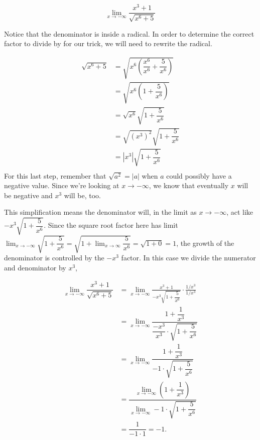 \documentclass{ximera}
\begin{document}
\begin{example}

\[
\lim_{x\to -\infty} \frac{x^3+1}{\sqrt{x^6+5}}
\]
\begin{explanation}
Notice that the denominator is inside a radical. In order to determine the correct factor to divide by for our trick, we will need to rewrite the radical.

\begin{align*}
	\sqrt{x^6 + 5} &= \sqrt{ x^6\left(\dfrac{x^6}{x^6} + \dfrac{5}{x^6}\right)}\\
				&=	\sqrt{ x^6\left( 1 + \dfrac{5}{x^6}\right) }\\
				&= \sqrt{x^6} \sqrt{1 + \dfrac{5}{x^6} }\\
				&= \sqrt{(x^3)^2} \sqrt{1 + \dfrac{5}{x^6} }\\
				&= |x^3|\sqrt{1 + \dfrac{5}{x^6} }\\
\end{align*}
For this last step, remember that $\sqrt{a^2} = |a|$ when $a$ could possibly have a negative value. Since we're looking at $x\to -\infty$, 
we know that eventually $x$ will be negative and $x^3$ will be, too.

This simplification means the denominator will, in the limit as $x\to -\infty$, act like $-x^3\sqrt{1+\dfrac{5}{x^6}}$. Since the square root factor here
has limit $\displaystyle \lim_{x\to -\infty} \sqrt{1 + \dfrac{5}{x^6} } = \sqrt{1 + \lim_{x\to \infty} \dfrac{5}{x^6}} = \sqrt{1+0}=1$, the growth of the denominator is controlled by the $-x^3$ factor. In this case we divide the numerator and denominator by $x^3$,

\begin{align*}
\lim_{x\to -\infty} \dfrac{x^3+1}{\sqrt{x^6+5}} &= \lim_{x\to -\infty} \frac{x^3+1}{-x^3 \sqrt{1 + \dfrac{5}{x^6} }} \cdot \frac{1/x^3}{1/x^3}\\
	&= \lim_{x\to -\infty} \dfrac{1+\dfrac{1}{x^3}}{\dfrac{-x^3}{x^3}\cdot\sqrt{1+\dfrac{5}{x^6}}}\\
	&= \lim_{x\to -\infty} \dfrac{1+\dfrac{1}{x^3}}{-1\cdot \sqrt{1+\dfrac{5}{x^6}}} \\
	&= \dfrac{ \lim_{x\to -\infty}\left(1+\dfrac{1}{x^3}\right)}{\lim_{x\to -\infty}-1\cdot\sqrt{1+\dfrac{5}{x^6}}}\\
	&= \dfrac{1}{-1\cdot 1} = -1.
\end{align*}

\end{explanation}
\end{example}
\end{document}
